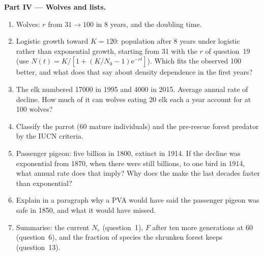 \begin{problem}
\medskip
\noindent\textbf{Part IV --- Wolves and lists.}
\begin{enumerate}[resume]
  \item Wolves: $r$ from $31 \to 100$ in 8 years, and the doubling time.
  \item Logistic growth toward $K = 120$: population after 8 years
        under logistic rather than exponential growth, starting from 31
        with the $r$ of question~19 (use $N(t) = K/[1 + (K/N_{0} -
        1)\mathrm{e}^{-rt}]$). Which fits the observed 100 better, and what
        does that say about density dependence in the first years?
  \item The elk numbered \num{17000} in 1995 and \num{4000} in 2015.
        Average annual rate of decline. How much of it can wolves eating
        \num{20} elk each a year account for at 100 wolves?
  \item Classify the parrot (60 mature individuals) and the pre-rescue
        forest predator by the IUCN criteria.
  \item Passenger pigeon: five billion in 1800, extinct in 1914. If the
        decline was exponential from 1870, when there were still
        billions, to one bird in 1914, what annual rate does that imply?
        Why does the  make the last decades faster than
        exponential?
  \item Explain in a paragraph why a PVA would have said the passenger
        pigeon was safe in 1850, and what it would have missed.
  \item Summarise: the current $N_{e}$ (question~1), $F$ after ten more
        generations at 60 (question~6), and the fraction of species the
        shrunken forest keeps (question~13).
\end{enumerate}
\end{problem}
